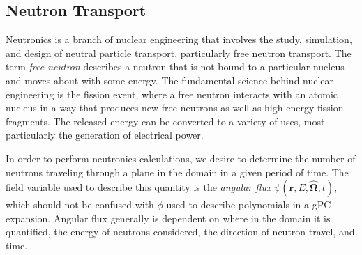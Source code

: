 \subsection{Neutron Transport}
Neutronics is a branch of nuclear engineering that involves the study, simulation, and design of neutral
particle transport, particularly free neutron transport.  The term \emph{free neutron} describes a neutron
that is not bound to a particular nucleus and moves about with some energy.  The fundamental science behind
nuclear engineering is the fission event, where a free neutron interacts with an atomic nucleus in a way that
produces new free neutrons as well as high-energy fission fragments.  The released energy can be converted to
a variety of uses, most particularly the generation of electrical power.

In order to perform neutronics calculations, we desire to determine the number of neutrons traveling through a
plane in the domain in a given period of time.  The field variable used to describe this quantity is the
\emph{angular flux} $\psi(\mathbf{r},E,\mathbf{\hat\Omega},t)$, which should not be confused with $\phi$ used
to describe polynomials in a gPC expansion.  Angular flux generally is dependent on where in the domain it is
quantified, the energy of neutrons considered, the direction of neutron travel, and time.  

